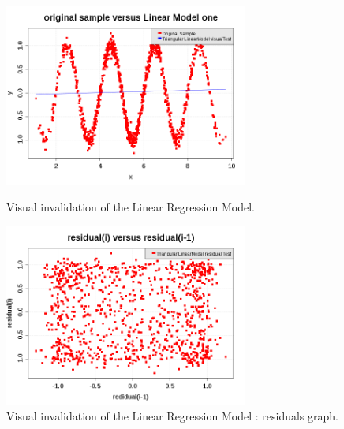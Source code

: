 \begin{figure}[H]
  \begin{minipage}{8cm}
    \begin{center}
      \includegraphics[width=8cm]{linearRegression_GraphWrong2.png}
      \caption{Visual invalidation of the Linear Regression Model.}
      \label{LMWrong2}
    \end{center}
  \end{minipage}
  \hfill
  \begin{minipage}{8cm}
    \begin{center}
      \includegraphics[width=8cm]{linearRegression_residualGraphWrong2.png}
      \caption{Visual invalidation of the Linear Regression Model : residuals graph.}
      \label{LMResidualWrong2}
    \end{center}
  \end{minipage}
\end{figure}


